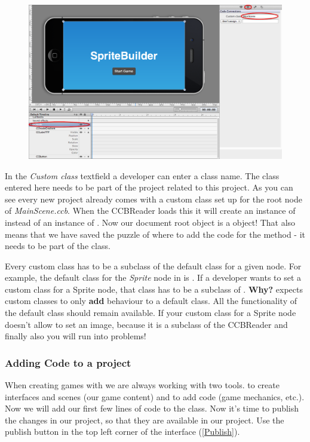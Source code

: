 \begin{figure}[H]
		\centering
		\includegraphics[width=0.9\linewidth]{images/firstproject/custom_class.png}
\end{figure}

In the \textit{Custom class} textfield a developer can enter a class name. The
class entered here needs to be part of the \xcode{} project related to this
\SB{} project. As you can see every new \SB{} project already comes with a
custom class set up for the root node of \textit{MainScene.ccb}. When the
CCBReader loads this \ccbfile{} it will create an instance of  instead of an instance of
.
Now our document root object is a  object! That also means
that we have saved the puzzle of where to add the code for the
 method - it needs to be part of the
 class.

\begin{details} 
Every custom class has to be a subclass of the default class for a given node.
For example, the default class for the \textit{Sprite} node in \SB{} is
\ccsprite{}. If a developer wants to set a custom class for a Sprite node, that
class has to be a subclass of \ccsprite{}. \textbf{Why?} \SB{} expects custom
classes to only \textbf{add} behaviour to a default class. All the functionality
of the default class should remain available. If your custom class for a Sprite
node doesn't allow \SB{} to set an image, because it is a subclass of \ccnode{}
the CCBReader and finally also you will run into problems!
\end{details}

\subsubsection{Adding Code to a \SB{} project}
When creating games with \SB{} we are always working with two tools. \SB{} to
create interfaces and scenes (our game content) and \xcode{} to add code (game
mechanics, etc.). Now we will add our first few lines of code to the
 class. Now it's time to publish the changes in our \SB{}
project, so that they are available in our \xcode{} project. Use the publish
button in the top left corner of the \SB{} interface (\ref{Publish}). 

